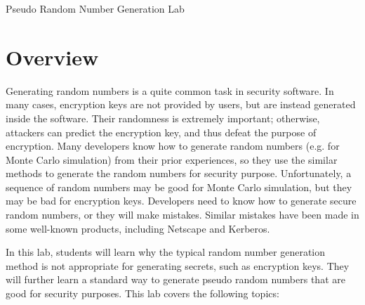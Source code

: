 
\newcommand{\commonfolder}{../../common-files}










\begin{center}
{\LARGE Pseudo Random Number Generation Lab}
\end{center}




\section{Overview}

Generating random numbers is a quite common task in security software. 
In many cases, encryption keys are not provided by users, but are instead 
generated inside the software. Their randomness is extremely important;
otherwise, attackers can predict the encryption key, and thus defeat the 
purpose of encryption. Many developers know how to generate random
numbers (e.g. for Monte Carlo simulation)
from their prior experiences, so they use the similar methods
to generate the random numbers for security purpose. Unfortunately,
a sequence of random numbers may be good for Monte Carlo simulation, but
they may be bad for encryption keys. Developers need to know how to
generate secure random numbers, or they will make mistakes. Similar
mistakes have been made in some well-known products, including
Netscape and Kerberos. 

In this lab, students will learn why the typical 
random number generation method is not appropriate for generating 
secrets, such as encryption keys. They will further learn 
a standard way to generate pseudo random numbers that are good for security purposes.
This lab covers the following topics:

